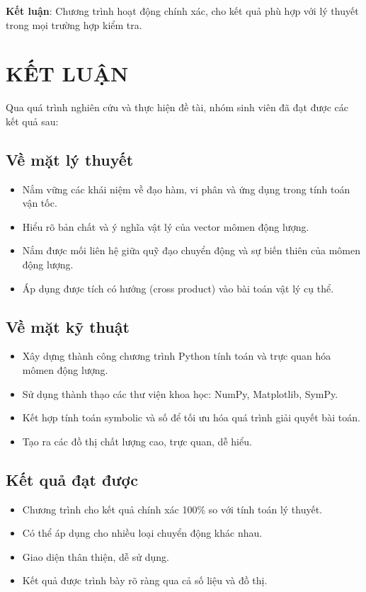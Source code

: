 \documentclass{report}
\newcounter{line}
\begin{document}
\textbf{Kết luận}: Chương trình hoạt động chính xác, cho kết quả phù hợp với lý thuyết trong mọi trường hợp kiểm tra.

\chapter*{KẾT LUẬN}

Qua quá trình nghiên cứu và thực hiện đề tài, nhóm sinh viên đã đạt được các kết quả sau:

\section*{Về mặt lý thuyết}
\begin{itemize}
    \item Nắm vững các khái niệm về đạo hàm, vi phân và ứng dụng trong tính toán vận tốc.
    \item Hiểu rõ bản chất và ý nghĩa vật lý của vector mômen động lượng.
    \item Nắm được mối liên hệ giữa quỹ đạo chuyển động và sự biến thiên của mômen động lượng.
    \item Áp dụng được tích có hướng (cross product) vào bài toán vật lý cụ thể.
\end{itemize}

\section*{Về mặt kỹ thuật}
\begin{itemize}
    \item Xây dựng thành công chương trình Python tính toán và trực quan hóa mômen động lượng.
    \item Sử dụng thành thạo các thư viện khoa học: NumPy, Matplotlib, SymPy.
    \item Kết hợp tính toán symbolic và số để tối ưu hóa quá trình giải quyết bài toán.
    \item Tạo ra các đồ thị chất lượng cao, trực quan, dễ hiểu.
\end{itemize}

\section*{Kết quả đạt được}
\begin{itemize}
    \item Chương trình cho kết quả chính xác 100\% so với tính toán lý thuyết.
    \item Có thể áp dụng cho nhiều loại chuyển động khác nhau.
    \item Giao diện thân thiện, dễ sử dụng.
    \item Kết quả được trình bày rõ ràng qua cả số liệu và đồ thị.
\end{itemize}
\end{document}
